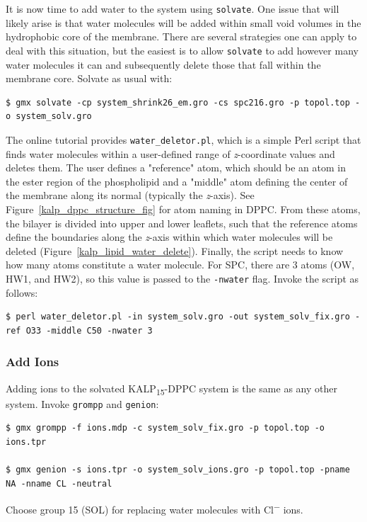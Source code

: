 \documentclass[9pt,tutorial,pubversion]{livecoms}
\begin{document}
It is now time to add water to the system using \texttt{solvate}. One issue that will likely arise is that water molecules will be added within small void volumes in the hydrophobic core of the membrane. There are several strategies one can apply to deal with this situation, but the easiest is to allow \texttt{solvate} to add however many water molecules it can and subsequently delete those that fall within the membrane core. Solvate as usual with:

\begin{lstlisting}
$ gmx solvate -cp system_shrink26_em.gro -cs spc216.gro -p topol.top -o system_solv.gro
\end{lstlisting}

The online tutorial provides \texttt{water\_deletor.pl}, which is a simple Perl script that finds water molecules within a user-defined range of {\em z}-coordinate values and deletes them. The user defines a "reference" atom, which should be an atom in the ester region of the phospholipid and a "middle" atom defining the center of the membrane along its normal (typically the {\em z}-axis). See Figure~\ref{kalp_dppc_structure_fig} for atom naming in DPPC. From these atoms, the bilayer is divided into upper and lower leaflets, such that the reference atoms define the boundaries along the {\em z}-axis within which water molecules will be deleted (Figure~\ref{kalp_lipid_water_delete}). Finally, the script needs to know how many atoms constitute a water molecule. For SPC, there are 3 atoms (OW, HW1, and HW2), so this value is passed to the \texttt{-nwater} flag. Invoke the script as follows:

\begin{lstlisting}
$ perl water_deletor.pl -in system_solv.gro -out system_solv_fix.gro -ref O33 -middle C50 -nwater 3
\end{lstlisting}

\subsubsection{Add Ions} \label{kalp_ions}

Adding ions to the solvated KALP\textsubscript{15}-DPPC system is the same as any other system. Invoke \texttt{grompp} and \texttt{genion}:

\begin{lstlisting}
$ gmx grompp -f ions.mdp -c system_solv_fix.gro -p topol.top -o ions.tpr

$ gmx genion -s ions.tpr -o system_solv_ions.gro -p topol.top -pname NA -nname CL -neutral
\end{lstlisting}
%
Choose group 15 (SOL) for replacing water molecules with Cl\textsuperscript{$-$} ions.
\end{document}
